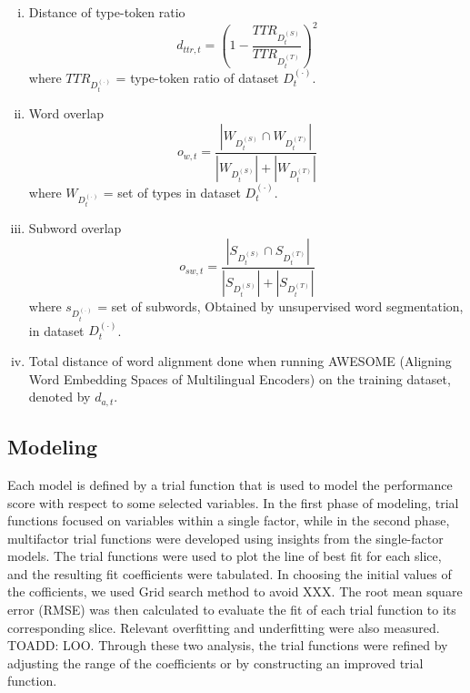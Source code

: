 \documentclass[11pt]{article}
\begin{document}
\begin{enumerate}[(a)]
\begin{enumerate}[(i)]
        \item Distance of type-token ratio
        \begin{equation*}
            d_{ttr,t} = \left( 1 - \frac{TTR_{D_t^{(S)}}}{TTR_{D_t^{(T)}}}\right)^2
        \end{equation*}
        where $TTR_{D_t^{(\cdot)}}$ = type-token ratio of dataset $D_t^{(\cdot)}$.

        \item Word overlap
        \begin{equation*}
            o_{w,t} = \frac{|W_{D_t^{(S)}} \cap W_{D_t^{(T)}}|}{|W_{D_t^{(S)}}| + |W_{D_t^{(T)}}|}
        \end{equation*}
        where $W_{D_t^{(\cdot)}}$ = set of types in dataset $D_t^{(\cdot)}$.

        \item Subword overlap
        \begin{equation*}
            o_{sw,t} = \frac{|S_{D_t^{(S)}} \cap S_{D_t^{(T)}}|}{|S_{D_t^{(S)}}| + |S_{D_t^{(T)}}|}
        \end{equation*}
        where $s_{D_t^{(\cdot)}}$ = set of subwords, Obtained by unsupervised word segmentation, in dataset $D_t^{(\cdot)}$.

        \item Total distance of word alignment done when running AWESOME (Aligning Word Embedding Spaces of Multilingual Encoders) on the training dataset, denoted by $d_{a,t}$.
    \end{enumerate}
    
\end{enumerate}

\subsection{Modeling}

Each model is defined by a trial function that is used to model the performance score with respect to some selected variables. In the first phase of modeling, trial functions focused on variables within a single factor, while in the second phase, multifactor trial functions were developed using insights from the single-factor models.
The trial functions were used to plot the line of best fit for each slice, and the resulting fit coefficients were tabulated. In choosing the initial values of the cofficients, we used Grid search method to avoid XXX. The root mean square error (RMSE) was then calculated to evaluate the fit of each trial function to its corresponding slice. Relevant overfitting and underfitting were also measured. TOADD: LOO. Through these two analysis, the trial functions were refined by adjusting the range of the coefficients or by constructing an improved trial function.
\end{document}
